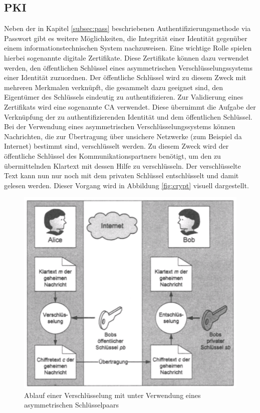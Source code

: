 \documentclass[
book,
a4paper,   
titlepage,  
halfparskip,
12pt        
]{scrartcl}
\begin{document}
\begin{onehalfspacing}
\subsection{\ac{PKI}}
\label{subsec:zert}
Neben der in Kapitel \vref{subsec:pass} beschriebenen Authentifizierungsmethode via Passwort gibt es weitere Möglichkeiten, die Integrität einer Identität gegenüber einem informationstechnischen System nachzuweisen. Eine wichtige Rolle spielen hierbei sogenannte digitale Zertifikate. Diese Zertifikate können dazu verwendet werden, den öffentlichen Schlüssel eines asymmetrischen Verschlüsselungssystems einer Identität zuzuordnen. Der öffentliche Schlüssel wird zu diesem Zweck mit mehreren Merkmalen verknüpft, die gesammelt dazu geeignet sind, den Eigentümer des Schlüssels eindeutig zu authentifizieren. Zur Validierung eines Zertifikats wird eine sogenannte \ac{CA} verwendet. Diese übernimmt die Aufgabe der Verknüpfung der zu authentifizierenden Identität und dem öffentlichen Schlüssel.\cite[S. 145f]{kerberos2}\newline
Bei der Verwendung eines asymmetrischen Verschlüsselungssystems können Nachrichten, die zur Übertragung über unsichere Netzwerke (zum Beispiel da Internet) bestimmt sind, verschlüsselt werden. Zu diesem Zweck wird der öffentliche Schlüssel des Kommunikationspartners benötigt, um den zu übermittelnden Klartext mit dessen Hilfe zu verschlüsseln. Der verschlüsselte Text kann nun nur noch mit dem privaten Schlüssel entschlüsselt und damit gelesen werden. Dieser Vorgang wird in Abbildung \vref{fig:crypt} visuell dargestellt.\cite[S. 5]{crypto}

\begin{figure}[h]
	\centering
	\includegraphics[width=0.6\linewidth]{crypt.png}
	\caption[Ablauf Verschlüsselung]{Ablauf einer Verschlüsselung mit unter Verwendung eines asymmetrischen Schlüsselpaars\cite[S. 6]{crypto}}
	\label{fig:crypt}
\end{figure}


\end{onehalfspacing}
\end{document}
